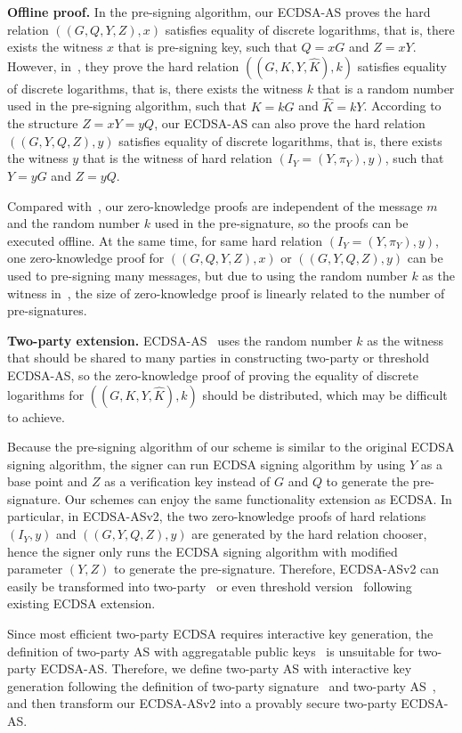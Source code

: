 \documentclass{llncs}
\begin{document}
\begin{trivlist}
\item \textbf{Offline proof.} In the pre-signing algorithm, our ECDSA-AS proves the hard relation $((G, Q, Y, Z),x)$ satisfies equality of discrete logarithms, that is, there exists the witness $x$ that is pre-signing key, such that $Q=xG$ and $Z=xY$. However, in~\cite{AumayrEEFHMMR20}, they prove the hard relation $((G, K, Y, \hat{K}),k)$ satisfies equality of discrete logarithms, that is, there exists the witness $k$ that is a random number used in the pre-signing algorithm, such that $K=kG$ and $\hat{K}=kY$. According to the structure $Z=xY=yQ$, our ECDSA-AS can also prove the hard relation $((G, Y, Q, Z), y)$ satisfies equality of discrete logarithms, that is, there exists the witness $y$ that is the witness of hard relation $(I_Y=(Y, \pi_Y),y)$, such that $Y=yG$ and $Z=yQ$.

Compared with~\cite{AumayrEEFHMMR20}, our zero-knowledge proofs are independent of the message $m$ and the random number $k$ used in the pre-signature, so the proofs can be executed offline. At the same time, for same hard relation $(I_Y=(Y, \pi_Y),y)$, one zero-knowledge proof for $((G, Q, Y, Z), x)$ or $((G, Y, Q, Z),y)$ can be used to pre-signing many messages, but due to using the random number $k$ as the witness in~\cite{AumayrEEFHMMR20}, the size of zero-knowledge proof is linearly related to the number of pre-signatures.
\end{trivlist}
\begin{trivlist}
\item \textbf{Two-party extension.} ECDSA-AS~\cite{AumayrEEFHMMR20} uses the random number $k$ as the witness that should be shared to many parties in constructing two-party or threshold ECDSA-AS, so the zero-knowledge proof of proving the equality of discrete logarithms for $((G, K, Y, \hat{K}),k)$ should be distributed, which may be difficult to achieve. 

Because the pre-signing algorithm of our scheme is similar to the original ECDSA signing algorithm, the signer can run ECDSA signing algorithm by using $Y$ as a base point and $Z$ as a verification key instead of $G$ and $Q$ to generate the pre-signature. Our schemes can enjoy the same functionality extension as ECDSA. In particular, in ECDSA-ASv2, the two zero-knowledge proofs of hard relations $(I_Y,y)$ and $((G, Y, Q, Z),y)$ are generated by the hard relation chooser, hence the signer only runs the ECDSA signing algorithm with modified parameter $(Y, Z)$ to generate the pre-signature. Therefore, ECDSA-ASv2 can easily be transformed into two-party~\cite{Lin17,CCLST19,YuenCX21} or even threshold version~\cite{GGN16,BGG17,LN18,GG18,DKLs19} following existing ECDSA extension. 

Since most efficient two-party ECDSA requires interactive key generation, the definition of two-party AS with aggregatable public keys~\cite{ErwigFHM021} is unsuitable for two-party ECDSA-AS. Therefore, we define two-party AS with interactive key generation following the definition of two-party signature~\cite{Lin17,CCLST19} and two-party AS~\cite{ErwigFHM021}, and then transform our ECDSA-ASv2 into a provably secure two-party ECDSA-AS. 
\end{trivlist}
\end{document}
